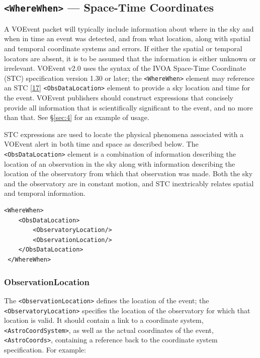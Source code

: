 \documentclass[11pt,a4paper]{ivoa}
\begin{document}
\subsection{{\tt <WhereWhen>} --- Space-Time Coordinates}
\label{sec:3.4}

A VOEvent packet will typically include information about where in the sky and when in time an event was detected, and from what location, along with spatial and temporal coordinate systems and errors. If either the spatial or temporal locators are absent, it is to be assumed that the information is either unknown or irrelevant. VOEvent v2.0 uses the syntax of the IVOA Space-Time Coordinate (STC) specification version 1.30 or later; the {\tt <WhereWhen>} element may reference an STC [\hyperref[bib17]{17}]
 {\tt <ObsDataLocation>} element to provide a sky location and time for the event. VOEvent publishers should construct expressions that concisely provide all information that is scientifically significant to the event, and no more than that. See \S\ref{sec:4} for an example of usage. 

STC expressions are used to locate the physical phenomena associated with a VOEvent alert in both time and space as described below. The {\tt <ObsDataLocation>} element is a combination of information describing the location of an observation in the sky along with information describing the location of the observatory from which that observation was made. Both the sky and the observatory are in constant motion, and STC inextricably relates spatial and temporal information. 

{\footnotesize
\begin{verbatim}
<WhereWhen>
    <ObsDataLocation>
        <ObservatoryLocation/>
        <ObservationLocation/>
    </ObsDataLocation>
 </WhereWhen>
\end{verbatim}}

\subsubsection{ObservationLocation}
\label{sec:3.4.1}

The {\tt <ObservationLocation>} defines the location of the event; the {\tt <ObservatoryLocation>} specifies the location of the observatory for which that location is valid. It should contain a link to a coordinate system, {\tt <AstroCoordSystem>}, as well as the actual coordinates of the event, {\tt <AstroCoords>}, containing a reference back to the coordinate system specification. For example: 
\end{document}
